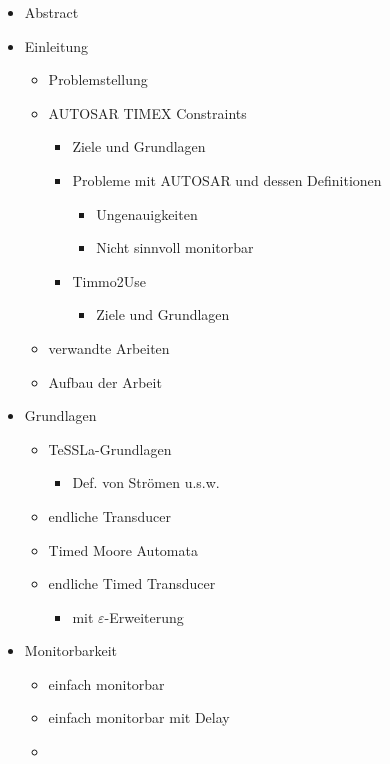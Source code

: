 \documentclass[]{article}
\begin{document}
\begin{itemize}
	\item
		Abstract
	\item
		Einleitung
		\begin{itemize}
			\item
				Problemstellung
			\item
				AUTOSAR TIMEX Constraints
				\begin{itemize}
					\item
						Ziele und Grundlagen
					\item
						Probleme mit AUTOSAR und dessen Definitionen
						\begin{itemize}
							\item
							Ungenauigkeiten
							\item
							Nicht sinnvoll monitorbar
						\end{itemize}
					\item
						Timmo2Use
						\begin{itemize}
							\item
								Ziele und Grundlagen
						\end{itemize}
				\end{itemize}
			\item
				verwandte Arbeiten
			\item
				Aufbau der Arbeit
		\end{itemize}
	\item
		Grundlagen
		\begin{itemize}
			\item
				TeSSLa-Grundlagen
				\begin{itemize}
					\item
					Def. von Strömen u.s.w.
				\end{itemize}
			\item
				endliche Transducer
			\item
				Timed Moore Automata
			\item
				endliche Timed Transducer
				\begin{itemize}
					\item
						mit $\varepsilon$-Erweiterung
				\end{itemize}
		\end{itemize}
	\item
		Monitorbarkeit
		\begin{itemize}
			\item
				einfach monitorbar
			\item
				einfach monitorbar mit Delay
			\item

\end{itemize}
\end{itemize}
\end{document}
